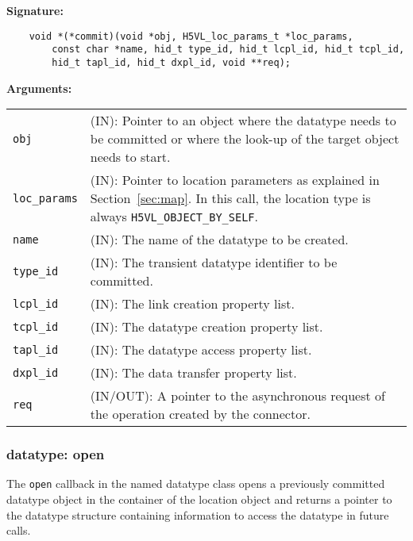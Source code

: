 \begin{mdframed}[style=bgbox]
\textbf{Signature:}
\begin{lstlisting}
    void *(*commit)(void *obj, H5VL_loc_params_t *loc_params, 
        const char *name, hid_t type_id, hid_t lcpl_id, hid_t tcpl_id, 
        hid_t tapl_id, hid_t dxpl_id, void **req);
\end{lstlisting}

\textbf{Arguments:}\\
\begin{tabular}{l p{13.5cm}}
  \texttt{obj} & (IN): Pointer to an object where the datatype needs
  to be committed or where the look-up of the target object needs to
  start.\\
  \texttt{loc\_params} & (IN): Pointer to location parameters as explained in
  Section~\ref{sec:map}. In this call, the location type is always \texttt{H5VL\_OBJECT\_BY\_SELF}. \\
  \texttt{name} & (IN): The name of the datatype to be created.\\
  \texttt{type\_id} & (IN): The transient datatype identifier to be
  committed. \\
  \texttt{lcpl\_id} & (IN): The link creation property list. \\
  \texttt{tcpl\_id} & (IN): The datatype creation property list.\\
  \texttt{tapl\_id} & (IN): The datatype access property list.\\
  \texttt{dxpl\_id} & (IN): The data transfer property list.\\
  \texttt{req} & (IN/OUT): A pointer to the asynchronous request of the
  operation created by the connector.\\
\end{tabular}
\end{mdframed}

\subsubsection{datatype: open}
The \texttt{open} callback in the named datatype class opens a
previously committed datatype object in the container of the location
object and returns a pointer to the datatype structure containing
information to access the datatype in future calls.\bigskip


